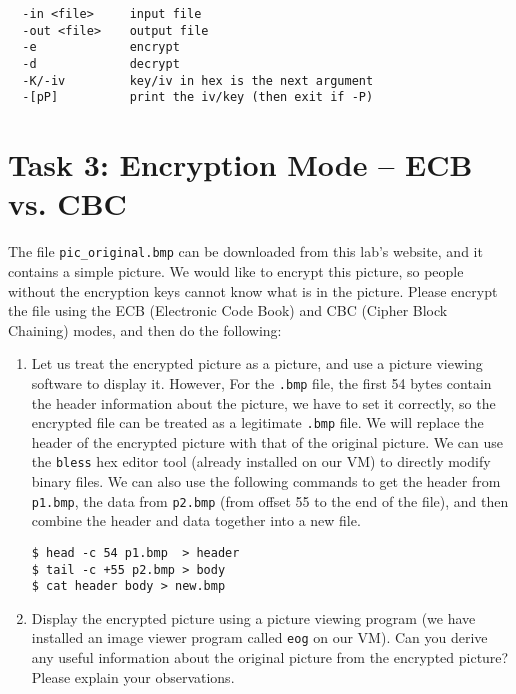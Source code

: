 \begin{lstlisting}
  -in <file>     input file
  -out <file>    output file
  -e             encrypt
  -d             decrypt
  -K/-iv         key/iv in hex is the next argument
  -[pP]          print the iv/key (then exit if -P)
\end{lstlisting}




\section{Task 3: Encryption Mode -- ECB vs. CBC} 

The file {\tt pic\_original.bmp} can be downloaded from 
this lab's website, and it contains a simple picture. 
We would like to encrypt this picture, so people without the 
encryption keys cannot know what is in the picture. Please 
encrypt the file using the ECB (Electronic Code Book)  
and CBC (Cipher Block Chaining) modes, and then do the following: 

\begin{enumerate}
\item Let us treat the encrypted picture as 
a picture, and use a picture viewing software to display it. However,
For the {\tt .bmp} file, the first 54 bytes contain the header information 
about the picture, we have to set it correctly, so 
the encrypted file can be treated as a legitimate {\tt .bmp} file.
We will replace the header of the encrypted picture 
with that of the original picture. We can use 
the \texttt{bless} hex editor tool (already installed 
on our VM) to directly modify binary files. We can also use the 
following commands to get the header from \texttt{p1.bmp},
the data from \texttt{p2.bmp} (from offset 55 to the end of the file), 
and then combine the header and data
together into a new file.

\begin{lstlisting}
$ head -c 54 p1.bmp  > header
$ tail -c +55 p2.bmp > body
$ cat header body > new.bmp
\end{lstlisting}


\item Display the encrypted picture using a picture 
viewing program (we have installed an image viewer program called
\texttt{eog} on our VM). 
Can you derive any useful information
about the original picture from the encrypted picture?
Please explain your observations.

\end{enumerate}

